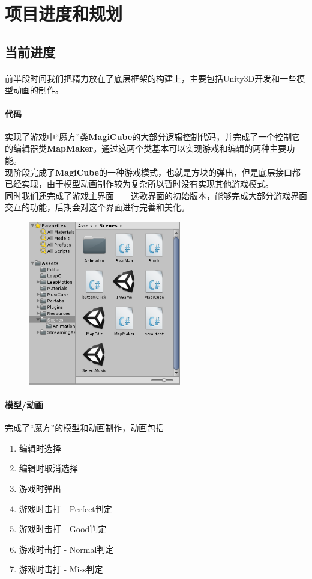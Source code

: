 \documentclass{article}
\begin{document}
\section{项目进度和规划}
\subsection{当前进度}
\paragraph{}
前半段时间我们把精力放在了底层框架的构建上，主要包括Unity3D开发和一些模型动画的制作。
\paragraph{代码}
实现了游戏中“魔方”类\textbf{MagiCube}的大部分逻辑控制代码，并完成了一个控制它的编辑器类\textbf{MapMaker}。通过这两个类基本可以实现游戏和编辑的两种主要功能。\\
现阶段完成了\textbf{MagiCube}的一种游戏模式，也就是方块的弹出，但是底层接口都已经实现，由于模型动画制作较为复杂所以暂时没有实现其他游戏模式。\\
同时我们还完成了游戏主界面——选歌界面的初始版本，能够完成大部分游戏界面交互的功能，后期会对这个界面进行完善和美化。
\begin{figure}[H]
  \centering
  \includegraphics[width=18em]{work.png}\\
  \caption{}\label{}
\end{figure}
\paragraph{模型/动画}
完成了“魔方”的模型和动画制作，动画包括
\begin{enumerate}
  \item 编辑时选择
  \item 编辑时取消选择
  \item 游戏时弹出
  \item 游戏时击打 - Perfect判定
  \item 游戏时击打 - Good判定
  \item 游戏时击打 - Normal判定
  \item 游戏时击打 - Miss判定
\end{enumerate}
\end{document}
